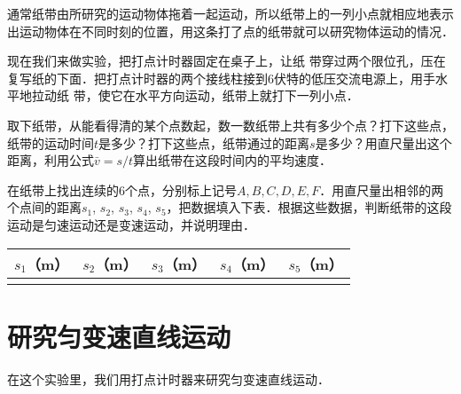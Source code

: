 \begin{figure}[H]
    \caption{}
\end{figure}

通常纸带由所研究的运动物体拖着一起运动，所以纸带上的一列小点就相应地表示出运动物体在不同时刻的位置，用这条打了点的纸带就可以研究物体运动的情况．

现在我们来做实验，把打点计时器固定在桌子上，让纸
带穿过两个限位孔，压在复写纸的下面．把打点计时器的两个接线柱接到6伏特的低压交流电源上，用手水平地拉动纸
带，使它在水平方向运动，纸带上就打下一列小点．

取下纸带，从能看得清的某个点数起，数一数纸带上共有多少个点？打下这些点，纸带的运动时间$t$是多少？打下这些点，纸带通过的距离$s$是多少？用直尺量出这个距离，利用公式$\bar v=s/t$算出纸带在这段时间内的平均速度．

在纸带上找出连续的6个点，分别标上记号$A,B,C,D,E,F$．用直尺量出相邻的两个点间的距离$s_1$, $s_2$, $s_3$, $s_4$, $s_5$，把数据填入下表．根据这些数据，判断纸带的这段运动是匀速运动还是变速运动，并说明理由．
\begin{table}[H]
    \centering
    \begin{tabularx}{\textwidth}{M|M|M|M|M}
        \hline
        $s_1$（m） & $s_2$（m） & $s_3$（m） & $s_4$（m） & $s_5$（m） \\
        \hline
                 &          &          &          &          \\
        \hline
    \end{tabularx}
\end{table}
\newpage
\section{研究匀变速直线运动}
在这个实验里，我们用打点计时器来研究匀变速直线运动．

